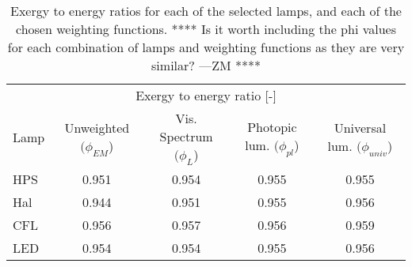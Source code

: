
\begin{table}
\centering %
\caption{Exergy to energy ratios for each of the selected lamps, and each of the chosen weighting functions. **** Is it worth including the phi values for each combination of lamps and weighting functions as they are very similar? ---ZM ****}
\begin{tabular}{l c c c c}
\hline
\multicolumn{5}{c}{Exergy to energy ratio [-]} \\
\cline{2-5}
  Lamp 
      & Unweighted $(\phi_{EM}$)
      & Vis. Spectrum $(\phi_{L}$)
      & Photopic lum. $(\phi_{pl}$)
      & Universal lum. $(\phi_{univ}$)  \\
\hline
  HPS & 0.951 & 0.954 & 0.955 & 0.955 \\
  Hal & 0.944 & 0.951 & 0.955 & 0.956 \\
  CFL & 0.956 & 0.957 & 0.956 & 0.959 \\
  LED & 0.954 & 0.954 & 0.955 & 0.956 \\
\hline
\end{tabular}
\label{tab:results_phi}
\end{table}